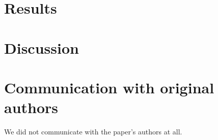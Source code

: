 \documentclass{article}
\begin{document}
    \section{Results}\label{sec:results}
    

    \section{Discussion}\label{sec:discussion}
    

    \section{Communication with original authors}
    We did not communicate with the paper's authors at all.

    
\end{document}
